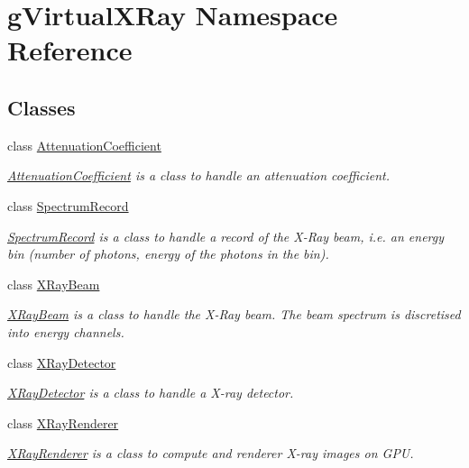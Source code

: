 \hypertarget{namespaceg_virtual_x_ray}{
\section{gVirtualXRay Namespace Reference}
\label{namespaceg_virtual_x_ray}
}
\subsection*{Classes}
\begin{DoxyCompactItemize}
\item 
class \hyperlink{classg_virtual_x_ray_1_1_attenuation_coefficient}{AttenuationCoefficient}
\begin{DoxyCompactList}\small\item\em \hyperlink{classg_virtual_x_ray_1_1_attenuation_coefficient}{AttenuationCoefficient} is a class to handle an attenuation coefficient. \end{DoxyCompactList}\item 
class \hyperlink{classg_virtual_x_ray_1_1_spectrum_record}{SpectrumRecord}
\begin{DoxyCompactList}\small\item\em \hyperlink{classg_virtual_x_ray_1_1_spectrum_record}{SpectrumRecord} is a class to handle a record of the X-\/Ray beam, i.e. an energy bin (number of photons, energy of the photons in the bin). \end{DoxyCompactList}\item 
class \hyperlink{classg_virtual_x_ray_1_1_x_ray_beam}{XRayBeam}
\begin{DoxyCompactList}\small\item\em \hyperlink{classg_virtual_x_ray_1_1_x_ray_beam}{XRayBeam} is a class to handle the X-\/Ray beam. The beam spectrum is discretised into energy channels. \end{DoxyCompactList}\item 
class \hyperlink{classg_virtual_x_ray_1_1_x_ray_detector}{XRayDetector}
\begin{DoxyCompactList}\small\item\em \hyperlink{classg_virtual_x_ray_1_1_x_ray_detector}{XRayDetector} is a class to handle a X-\/ray detector. \end{DoxyCompactList}\item 
class \hyperlink{classg_virtual_x_ray_1_1_x_ray_renderer}{XRayRenderer}
\begin{DoxyCompactList}\small\item\em \hyperlink{classg_virtual_x_ray_1_1_x_ray_renderer}{XRayRenderer} is a class to compute and renderer X-\/ray images on GPU. \end{DoxyCompactList}\end{DoxyCompactItemize}

